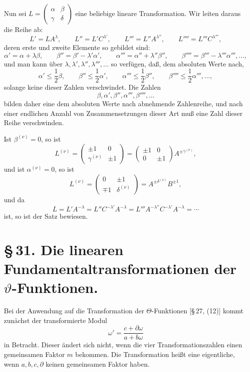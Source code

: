 \documentclass[11pt]{article}
\providecommand{\tht}{\vartheta}
\begin{document}
Nun sei $L=\begin{pmatrix}\alpha&\beta\\\gamma&\delta\end{pmatrix}$ eine beliebige lineare Transformation. Wir leiten daraus die Reihe ab:
\[
L'=LA^\lambda,
\qquad L''=L'C^{\lambda'},
\qquad L'''=L''A^{\lambda''},
\qquad L''''=L'''C^{\lambda'''},
\]
deren erste und zweite Elemente so gebildet sind:
\[
\alpha'=\alpha+\lambda\beta,
\qquad
\beta''=\beta'-\lambda'\alpha',
\qquad
\alpha'''=\alpha''+\lambda''\beta'',
\qquad
\beta''''=\beta'''-\lambda'''\alpha''',\ldots,
\]
und man kann über $\lambda,\lambda',\lambda'',\lambda''',\ldots$ so verfügen, daß, dem absoluten Werte nach,
\[
\alpha'\leq \frac12\beta,
\qquad
\beta''\leq \frac12\alpha',
\qquad
\alpha'''\leq \frac12\beta'',
\qquad
\beta''''\leq \frac12\alpha''',\ldots,
\]
solange keine dieser Zahlen verschwindet. Die Zahlen
\[
\beta,\alpha',\beta'',\alpha''',\beta'''',\ldots
\]
bilden daher eine dem absoluten Werte nach abnehmende Zahlenreihe, und nach einer endlichen Anzahl von Zusammensetzungen dieser Art muß eine Zahl dieser Reihe verschwinden.

Ist $\beta^{(\nu)}=0$, so ist
\[
L^{(\nu)}=\begin{pmatrix}\pm1&0\\\gamma^{(\nu)}&\pm1\end{pmatrix}
=\begin{pmatrix}\pm1&0\\0&\pm1\end{pmatrix}A^{\pm\gamma^{(\nu)}},
\]
und ist $\alpha^{(\nu)}=0$, so ist
\[
L^{(\nu)}=\begin{pmatrix}0&\pm1\\\mp1&\delta^{(\nu)}\end{pmatrix}=A^{\pm\delta^{(\nu)}}B^{\pm1},
\]
und da
\[
L=L'A^{-\lambda}=L''C^{-\lambda'}A^{-\lambda}=L'''A^{-\lambda''}C^{-\lambda'}A^{-\lambda}=\cdots
\]
ist, so ist der Satz bewiesen.

\section*{\S\,31. Die linearen Fundamentaltransformationen der $\tht$-Funktionen.}

Bei der Anwendung auf die Transformation der $\Theta$-Funktionen [\S\,27, (12)] kommt zunächst der transformierte Modul
\[
\omega'=\frac{c+\partial\omega}{a+b\omega}
\]
in Betracht. Dieser ändert sich nicht, wenn die vier Transformationszahlen einen gemeinsamen Faktor $m$ bekommen. Die Transformation heißt eine eigentliche, wenn $a,b,c,\partial$ keinen gemeinsamen Faktor haben.
\end{document}

